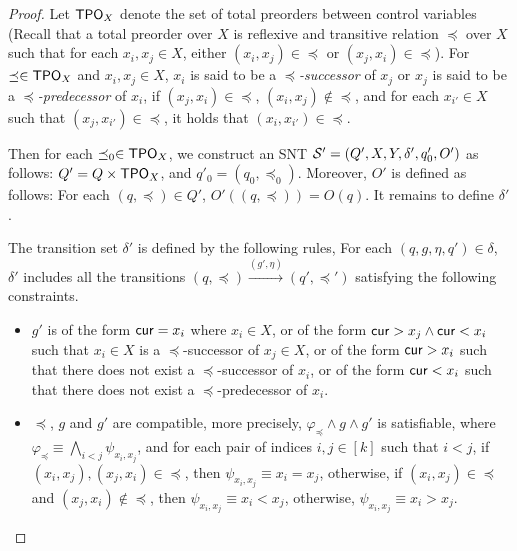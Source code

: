 \begin{appendix}
\begin{proof}
Let $\mathsf{TPO}_{X}$ denote the set of total preorders between control variables (Recall that a total preorder over $X$ is reflexive and transitive relation $\preceq$  over $X$ such that for each $x_i, x_j \in X$, either $(x_i, x_j) \in \preceq$ or $(x_j, x_i) \in \preceq$). For $\preceq \in \mathsf{TPO}_X$ and $x_i, x_j \in X$,  $x_i$ is said to be a \emph{$\preceq$-successor} of  $x_j$ or $x_j$ is said to be a \emph{$\preceq$-predecessor} of $x_i$, if $(x_j, x_i) \in \preceq$, $(x_i, x_j) \not \in \preceq$, and for each $x_{i'} \in X$ such that $(x_j, x_{i'}) \in \preceq$, it holds that $(x_i, x_{i'}) \in \preceq$. 

Then for each $\preceq_0 \in \mathsf{TPO}_X$, we construct an SNT ${\mathcal{S} }'= (Q', X, Y, \delta', q'_0, O')$ as follows: $Q'= Q \times \mathsf{TPO}_X$, and $q'_0=(q_0,  \preceq_0)$. Moreover, $O'$ is defined as follows: For each $(q, \preceq) \in Q'$, $O'((q, \preceq)) = O(q)$. It remains to define $\delta'$.

The transition set $\delta'$ is defined by the following rules, 
For each $(q, g, \eta, q') \in \delta$, $\delta'$ includes all the transitions $(q, \preceq) \xrightarrow{(g', \eta)} (q', \preceq')$ satisfying the following constraints. 
\begin{itemize}
\item  $g'$ is of the form $\mathsf{cur} = x_i$ where $x_i \in X$, or of the form $\mathsf{cur} > x_j \wedge \mathsf{cur} < x_i$ such that $x_i \in X$ is a $\preceq$-successor of $x_j \in X$, or of the form $\mathsf{cur} > x_i$ such that there does not exist a $\preceq$-successor of $x_i$, or of the form $\mathsf{cur} < x_i$ such that there does not exist a $\preceq$-predecessor of $x_i$.
%
\item $\preceq$, $g$ and $g'$ are compatible, more precisely, $\varphi_{\preceq} \wedge g \wedge g'$ is satisfiable, where $\varphi_{\preceq} \equiv \bigwedge \limits_{ i< j} \psi_{x_i, x_j}$, and for each pair of indices $i, j \in [k]$ such that $i < j$,  if $(x_i, x_j), (x_j, x_i) \in \preceq$, then $\psi_{x_i, x_j} \equiv x_i = x_j$, otherwise, if $(x_i, x_j) \in \preceq$ and $(x_j, x_i) \not \in \preceq$, then $\psi_{x_i, x_j} \equiv x_i < x_j$, otherwise, $\psi_{x_i, x_j} \equiv x_i > x_j$. 


\end{itemize}
\end{proof}
\end{appendix}
